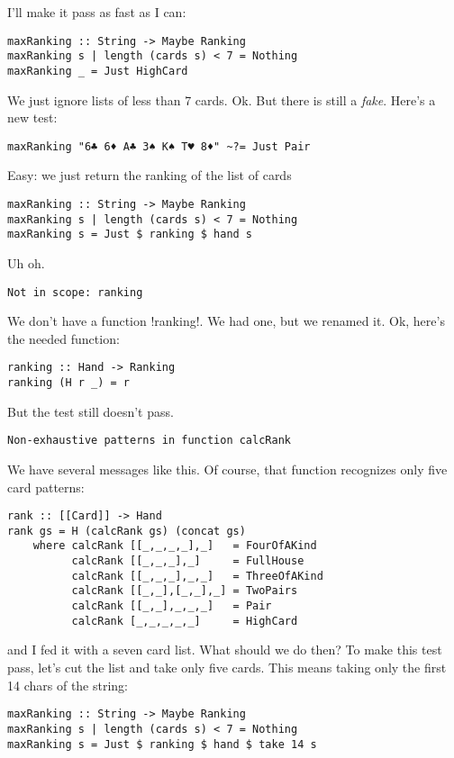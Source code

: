 \lhA \failure I'll make it pass as fast as I can:
\begin{lstlisting}[frame=single]
maxRanking :: String -> Maybe Ranking
maxRanking s | length (cards s) < 7 = Nothing
maxRanking _ = Just HighCard
\end{lstlisting}
\success We just ignore lists of less than 7 cards.
\lhN Ok. But there is still a \emph{fake}. Here's a new test:
\begin{lstlisting}[frame=single]
maxRanking "6♣ 6♦ A♣ 3♠ K♠ T♥ 8♦" ~?= Just Pair
\end{lstlisting}
\lhA Easy: we just return the ranking of the list of cards
\begin{lstlisting}[frame=single]
maxRanking :: String -> Maybe Ranking
maxRanking s | length (cards s) < 7 = Nothing
maxRanking s = Just $ ranking $ hand s
\end{lstlisting}
\error Uh oh.
\lhN
\begin{small}
\begin{verbatim}
Not in scope: ranking
\end{verbatim}
\end{small}
We don't have a function \il!ranking!. We had one, but we renamed it.
\lhA Ok, here's the needed function:
\begin{lstlisting}[frame=single]
ranking :: Hand -> Ranking
ranking (H r _) = r
\end{lstlisting}
\error But the test still doesn't pass.
\lhN 
\begin{small}
\begin{verbatim}
Non-exhaustive patterns in function calcRank
\end{verbatim}
\end{small}
We have several messages like this. 
\lhA Of course, that function recognizes only five card patterns:
\begin{lstlisting}[frame=single]
rank :: [[Card]] -> Hand
rank gs = H (calcRank gs) (concat gs)  
    where calcRank [[_,_,_,_],_]   = FourOfAKind 
          calcRank [[_,_,_],_]     = FullHouse
          calcRank [[_,_,_],_,_]   = ThreeOfAKind
          calcRank [[_,_],[_,_],_] = TwoPairs
          calcRank [[_,_],_,_,_]   = Pair    
          calcRank [_,_,_,_,_]     = HighCard 
\end{lstlisting}
\error and I fed it with a seven card list.
\lhN What should we do then?
\lhA To make this test pass, let's cut the list and take only five cards. This means taking only the first 14 chars of the string:
\begin{lstlisting}[frame=single]
maxRanking :: String -> Maybe Ranking
maxRanking s | length (cards s) < 7 = Nothing
maxRanking s = Just $ ranking $ hand $ take 14 s
\end{lstlisting} %

